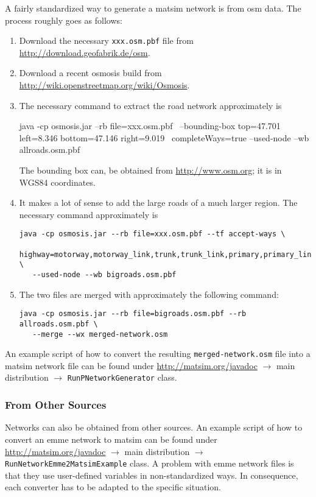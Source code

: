 A fairly standardized way to generate a \gls{matsim} network is from \gls{osm} data.  The process roughly goes as follows:
\begin{enumerate}

\item Download the necessary \lstinline{xxx.osm.pbf} file from \url{http://download.geofabrik.de/osm}.

\item Download a recent \gls{osmosis} build from \url{http://wiki.openstreetmap.org/wiki/Osmosis}.

\item The necessary command to extract the road network approximately is
\begin{shell}
java -cp osmosis.jar --rb file=xxx.osm.pbf \
   --bounding-box top=47.701 left=8.346 bottom=47.146 right=9.019 \
   completeWays=true --used-node --wb allroads.osm.pbf
\end{shell}
The bounding box can, \eg be obtained from \url{http://www.osm.org}; it is in WGS84 coordinates.

\item It makes a lot of sense to add the large roads of a much larger region.  The necessary command approximately is
\begin{lstlisting}
java -cp osmosis.jar --rb file=xxx.osm.pbf --tf accept-ways \
   highway=motorway,motorway_link,trunk,trunk_link,primary,primary_link \ 
   --used-node --wb bigroads.osm.pbf
\end{lstlisting}

\item The two files are merged with approximately the following command:
\begin{lstlisting}
java -cp osmosis.jar --rb file=bigroads.osm.pbf --rb allroads.osm.pbf \
   --merge --wx merged-network.osm
\end{lstlisting}

\end{enumerate}
An example script of how to convert the resulting \lstinline{merged-network.osm} file into a \gls{matsim} network file can be found under \url{http://matsim.org/javadoc} $\to$ main distribution $\to$ \lstinline{RunPNetworkGenerator} class.

\subsubsection{From Other Sources}

Networks can also be obtained from other sources.  An example script of how to convert an \gls{emme} network to \gls{matsim} can be found under \url{http://matsim.org/javadoc} $\to$ main distribution $\to$ \lstinline{RunNetworkEmme2MatsimExample} class.  A problem with \gls{emme} network files is that they use user-defined variables in non-standardized ways.  In consequence, each converter has to be adapted to the specific situation.

